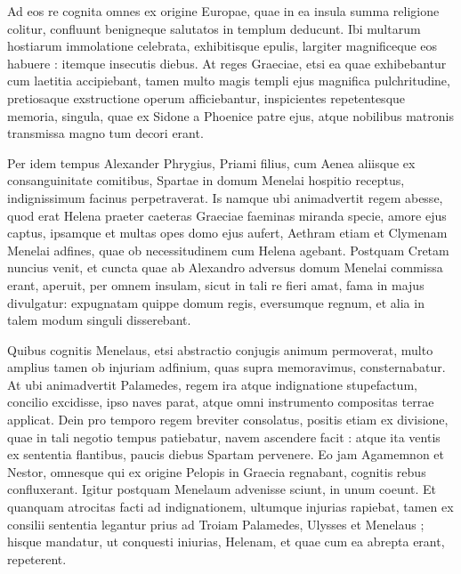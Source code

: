 \documentclass{article}
\begin{document}
\begin{pages}
\begin{Rightside}
Ad eos re cognita omnes ex origine Europae, quae in ea insula summa religione colitur, confluunt benigneque salutatos in templum deducunt. Ibi multarum hostiarum immolatione celebrata, exhibitisque epulis, largiter magnificeque eos habuere : itemque insecutis diebus. At reges Graeciae, etsi ea quae exhibebantur cum laetitia accipiebant, tamen multo magis templi ejus magnifica pulchritudine, pretiosaque exstructione operum afficiebantur, inspicientes repetentesque memoria, singula, quae ex Sidone a Phoenice patre ejus, atque nobilibus matronis transmissa magno tum decori erant.

Per idem tempus Alexander Phrygius, Priami filius, cum Aenea aliisque ex consanguinitate comitibus, Spartae in domum Menelai hospitio receptus, indignissimum facinus perpetraverat. Is namque ubi animadvertit regem abesse, quod erat Helena praeter caeteras Graeciae faeminas miranda specie, amore ejus captus, ipsamque et multas opes domo ejus aufert, Aethram etiam et Clymenam Menelai adfines, quae ob necessitudinem cum Helena agebant. Postquam Cretam nuncius venit, et cuncta quae ab Alexandro adversus domum Menelai commissa erant, aperuit, per omnem insulam, sicut in tali re fieri amat, fama in majus divulgatur: expugnatam quippe domum regis, eversumque regnum, et alia in talem modum singuli disserebant.


Quibus cognitis Menelaus, etsi abstractio conjugis animum permoverat, multo amplius tamen ob injuriam adfinium, quas supra memoravimus, consternabatur. At ubi animadvertit Palamedes, regem ira atque indignatione stupefactum, concilio excidisse, ipso naves parat, atque omni instrumento compositas terrae applicat. Dein pro temporo regem breviter consolatus, positis etiam ex divisione, quae in tali negotio tempus patiebatur, navem ascendere facit : atque ita ventis ex sententia flantibus, paucis diebus Spartam pervenere. Eo jam Agamemnon et Nestor, omnesque qui ex origine Pelopis in Graecia regnabant, cognitis rebus confluxerant. Igitur postquam Menelaum advenisse sciunt, in unum coeunt. Et quanquam atrocitas facti ad indignationem, ultumque injurias rapiebat, tamen ex consilii sententia legantur prius ad Troiam Palamedes, Ulysses et Menelaus ; hisque mandatur, ut conquesti iniurias, Helenam, et quae cum ea abrepta erant, repeterent.


\end{Rightside}
\end{pages}
\end{document}
